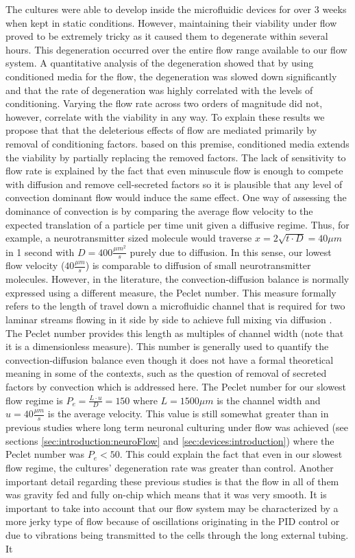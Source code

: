 The cultures were able to develop inside the microfluidic devices for over 3 weeks when kept in static conditions. However, maintaining their viability under flow proved to be extremely tricky as it caused them to degenerate within several hours. This degeneration occurred over the entire flow range available to our flow system. A quantitative analysis of the degeneration showed that by using conditioned media for the flow, the degeneration was slowed down significantly and that the rate of degeneration was highly correlated with the levels of conditioning. Varying the flow rate across two orders of magnitude did not, however, correlate with the viability in any way. To explain these results we propose that that the deleterious effects of flow are mediated primarily by removal of conditioning factors. based on this premise, conditioned media extends the viability by partially replacing the removed factors. The lack of sensitivity to flow rate is explained by the fact that even minuscule flow is enough to compete with diffusion and remove cell-secreted factors so it is plausible that any level of convection dominant flow would induce the same effect. One way of assessing the dominance of convection is by comparing the average flow velocity to the expected translation of a particle per time unit given a diffusive regime. Thus, for example, a neurotransmitter sized molecule would traverse \(x=2\sqrt{t\cdot D}=40\mu m\) in 1 second with \(D=400 \frac{\mu m^{2}}{s}\) \cite{johnstoneThesis} purely due to diffusion. In this sense, our lowest flow velocity (\(40 \frac{\mu m}{s}\)) is comparable to diffusion of small neurotransmitter molecules. However, in the literature, the convection-diffusion balance is normally expressed using a different measure, the Peclet number. This measure formally refers to the length of travel down a microfluidic channel that is required for two laminar streams flowing in it side by side to achieve full mixing via diffusion \cite{squires2005microfluidics}. The Peclet number provides this length as multiples of channel width (note that it is a dimensionless measure). This number is generally used to quantify the convection-diffusion balance even though it does not have a formal theoretical meaning in some of the contexts, such as the question of removal of secreted factors by convection which is addressed here. The Peclet number for our slowest flow regime is \(P_{e}=\frac{L\cdot u}{D}=150\) where \(L=1500\mu m\) is the channel width and \(u=40\frac{\mu m}{s}\) is the average velocity. This value is still somewhat greater than in previous studies where long term neuronal culturing under flow was achieved (see sections \ref{sec:introduction:neuroFlow} and \ref{sec:devices:introduction}) where the Peclet number was \(P_{e}<50\). This could explain the fact that even in our slowest flow regime, the cultures' degeneration rate was greater than control. Another important detail regarding these previous studies is that the flow in all of them was gravity fed and fully on-chip which means that it was very smooth. It is important to take into account that our flow system may be characterized by a more jerky type of flow because of oscillations originating in the PID control or due to vibrations being transmitted to the cells through the long external tubing. It 
